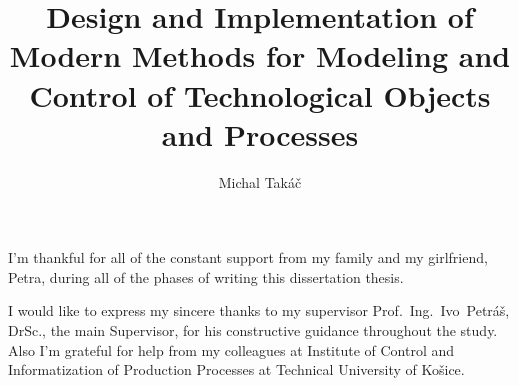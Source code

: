 \documentclass[]{tukethesis}
\author{Michal Takáč}
\title{Design and Implementation of Modern Methods for Modeling and Control of Technological Objects and Processes}
\subtitle{}
\begin{document}
\renewcommand\theHfigure{\theHsection.\arabic{figure}}
\renewcommand\theHtable{\theHsection.\arabic{table}}

\firstpage

\titlepage


%
%

\abstrakte %
\newpage
\abstrakt %

\endabstract %


\declaration

\acknowledgement %
I'm thankful for all of the constant support from my family and my girlfriend, Petra, during all of the phases of writing this dissertation thesis.

I would like to express my sincere thanks to my supervisor Prof.~Ing.~Ivo~Petráš, DrSc., the main Supervisor, for his constructive guidance throughout the study. Also I'm grateful for help from my colleagues at Institute of Control and Informatization of Production Processes at Technical University of Košice.
\end{document}
